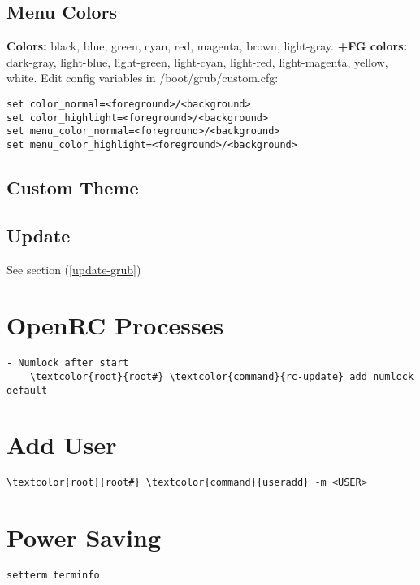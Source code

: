\documentclass[10pt, a4paper, onecolumn, openany]{book}         %
\begin{document}
\subsection{Menu Colors}
\textbf{Colors:} black, blue, green, cyan, red, magenta, brown, light-gray.\newline
\textbf{+FG colors:} dark-gray, light-blue, light-green, light-cyan, light-red, light-magenta, yellow, white.\newline
Edit config variables in \textcolor{file}{/boot/grub/custom.cfg}:
\begin{Verbatim}[commandchars=\\\{\}]
set color_normal=<foreground>/<background>
set color_highlight=<foreground>/<background>
set menu_color_normal=<foreground>/<background>
set menu_color_highlight=<foreground>/<background>
\end{Verbatim}

\subsection{Custom Theme}

\subsection{Update}
See section (\underline{\ref{update-grub}})

\section{OpenRC Processes}
\begin{Verbatim}[commandchars=\\\{\}]
- Numlock after start
    \textcolor{root}{root#} \textcolor{command}{rc-update} add numlock default
\end{Verbatim}

\section{Add User}
\begin{Verbatim}[commandchars=\\\{\}]
    \textcolor{root}{root#} \textcolor{command}{useradd} -m <USER>
\end{Verbatim}

\section{Power Saving}
\begin{Verbatim}[commandchars=\\\{\}]
setterm terminfo
\end{Verbatim}
\end{document}
